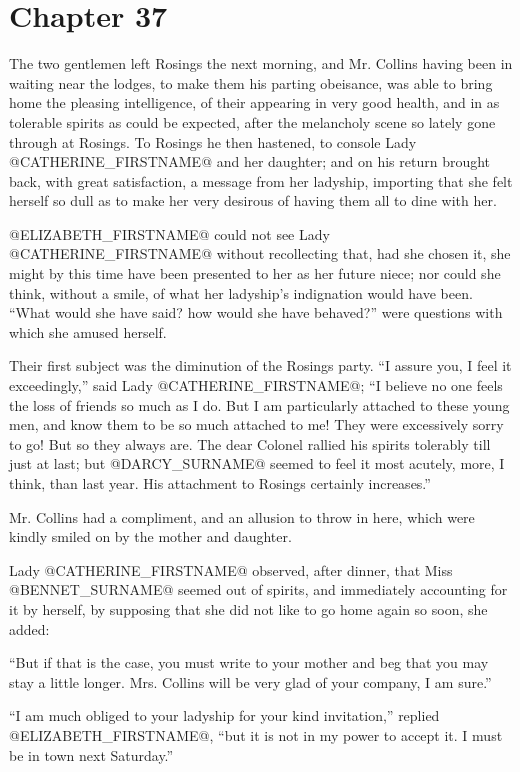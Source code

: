 \chapter*{Chapter 37}


The two gentlemen left Rosings the next morning, and Mr. Collins having
been in waiting near the lodges, to make them his parting obeisance, was
able to bring home the pleasing intelligence, of their appearing in very
good health, and in as tolerable spirits as could be expected, after the
melancholy scene so lately gone through at Rosings. To Rosings he then
hastened, to console Lady @CATHERINE_FIRSTNAME@ and her daughter; and on his return
brought back, with great satisfaction, a message from her ladyship,
importing that she felt herself so dull as to make her very desirous of
having them all to dine with her.

@ELIZABETH_FIRSTNAME@ could not see Lady @CATHERINE_FIRSTNAME@ without recollecting that, had
she chosen it, she might by this time have been presented to her as
her future niece; nor could she think, without a smile, of what her
ladyship's indignation would have been. ``What would she have said? how
would she have behaved?'' were questions with which she amused herself.

Their first subject was the diminution of the Rosings party. ``I assure
you, I feel it exceedingly,'' said Lady @CATHERINE_FIRSTNAME@; ``I believe no one
feels the loss of friends so much as I do. But I am particularly
attached to these young men, and know them to be so much attached to
me! They were excessively sorry to go! But so they always are. The
dear Colonel rallied his spirits tolerably till just at last; but @DARCY_SURNAME@
seemed to feel it most acutely, more, I think, than last year. His
attachment to Rosings certainly increases.''

Mr. Collins had a compliment, and an allusion to throw in here, which
were kindly smiled on by the mother and daughter.

Lady @CATHERINE_FIRSTNAME@ observed, after dinner, that Miss @BENNET_SURNAME@ seemed out of
spirits, and immediately accounting for it by herself, by supposing that
she did not like to go home again so soon, she added:

``But if that is the case, you must write to your mother and beg that
you may stay a little longer. Mrs. Collins will be very glad of your
company, I am sure.''

``I am much obliged to your ladyship for your kind invitation,'' replied
@ELIZABETH_FIRSTNAME@, ``but it is not in my power to accept it. I must be in town
next Saturday.''

